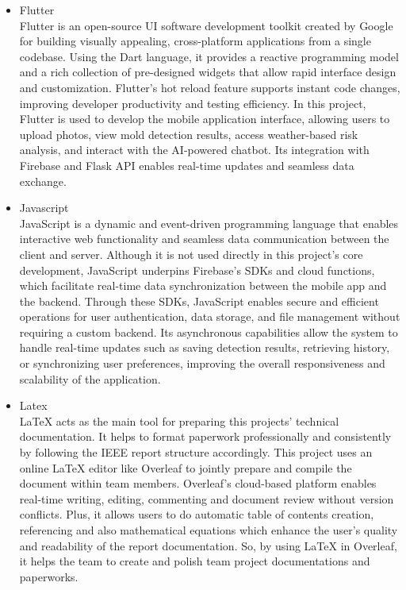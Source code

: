 \documentclass[conference]{IEEEtran}
\begin{document}
\begin{itemize}
        \item Flutter \\
        Flutter is an open-source UI software development toolkit created by Google for building visually appealing, cross-platform applications from a single codebase. Using the Dart language, it provides a reactive programming model and a rich collection of pre-designed widgets that allow rapid interface design and customization. Flutter’s hot reload feature supports instant code changes, improving developer productivity and testing efficiency. In this project, Flutter is used to develop the mobile application interface, allowing users to upload photos, view mold detection results, access weather-based risk analysis, and interact with the AI-powered chatbot. Its integration with Firebase and Flask API enables real-time updates and seamless data exchange. \\
        
        \item Javascript \\
        JavaScript is a dynamic and event-driven programming language that enables interactive web functionality and seamless data communication between the client and server. Although it is not used directly in this project’s core development, JavaScript underpins Firebase’s SDKs and cloud functions, which facilitate real-time data synchronization between the mobile app and the backend. Through these SDKs, JavaScript enables secure and efficient operations for user authentication, data storage, and file management without requiring a custom backend. Its asynchronous capabilities allow the system to handle real-time updates such as saving detection results, retrieving history, or synchronizing user preferences, improving the overall responsiveness and scalability of the application. \\

        \item Latex \\
        LaTeX acts as the main tool for preparing this projects' technical documentation. It helps to format paperwork professionally and consistently by following the IEEE report structure accordingly. This project uses an online LaTeX editor like Overleaf to jointly prepare and compile the document within team members. Overleaf’s cloud-based platform enables real-time writing, editing, commenting and document review without version conflicts. Plus, it allows users to do automatic table of contents creation, referencing and also mathematical equations which enhance the user’s quality and readability of the report documentation. So, by using LaTeX in Overleaf, it helps the team to create and polish team project documentations and paperworks. \\
        

\end{itemize}
\end{document}
